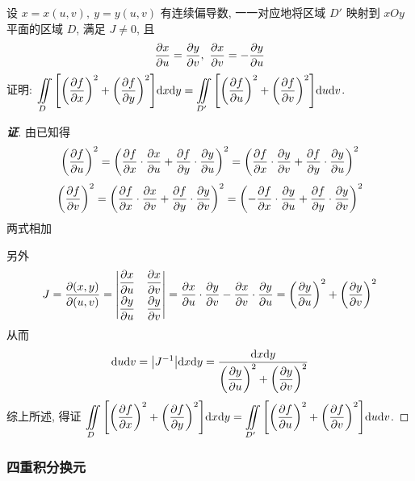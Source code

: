\begin{example}
    设 $x=x(u,v),~y=y(u,v)$ 有连续偏导数, 一一对应地将区域 $D'$ 映射到 $xOy$ 平面的区域 $D$, 满足 $J\neq0$, 且
    $$\pdv{x}{u}=\pdv{y}{v},~\pdv{x}{v}=-\pdv{y}{u}$$
    证明: $\displaystyle \iint\limits_D\qty[\qty(\pdv{f}{x})^2+\qty(\pdv{f}{y})^2]\dd x\dd y=\iint\limits_{D'}\qty[\qty(\pdv{f}{u})^2+\qty(\pdv{f}{v})^2]\dd u\dd v$.
\end{example}
\begin{proof}[{\songti \textbf{证}}]
    由已知得 $$\qty(\pdv{f}{u})^2=\qty(\pdv{f}{x}\cdot\pdv{x}{u}+\pdv{f}{y}\cdot\pdv{y}{u})^2=\qty(\pdv{f}{x}\cdot\pdv{y}{v}+\pdv{f}{y}\cdot\pdv{y}{u})^2$$
    $$\qty(\pdv{f}{v})^2=\qty(\pdv{f}{x}\cdot\pdv{x}{v}+\pdv{f}{y}\cdot\pdv{y}{v})^2=\qty(-\pdv{f}{x}\cdot\pdv{y}{u}+\pdv{f}{y}\cdot\pdv{y}{v})^2$$
    两式相加
    另外 $$J=\pdv{(x,y)}{(u,v)}=\begin{vmatrix}
            \displaystyle\pdv{x}{u} & \displaystyle\pdv{x}{v} \\[6pt]
            \displaystyle\pdv{y}{u} & \displaystyle\pdv{y}{v}
        \end{vmatrix}=\pdv{x}{u}\cdot\pdv{y}{v}-\pdv{x}{v}\cdot\pdv{y}{u}=\qty(\pdv{y}{u})^2+\qty(\pdv{y}{v})^2$$
    从而 $$\dd u\dd v=\qty|J^{-1}|\dd x\dd y=\dfrac{\dd x\dd y}{\qty(\displaystyle\pdv{y}{u})^2+\qty(\displaystyle\pdv{y}{v})^2}$$
    综上所述, 得证 $\displaystyle \iint\limits_D\qty[\qty(\pdv{f}{x})^2+\qty(\pdv{f}{y})^2]\dd x\dd y=\iint\limits_{D'}\qty[\qty(\pdv{f}{u})^2+\qty(\pdv{f}{v})^2]\dd u\dd v$.
\end{proof}

\subsubsection{四重积分换元}

